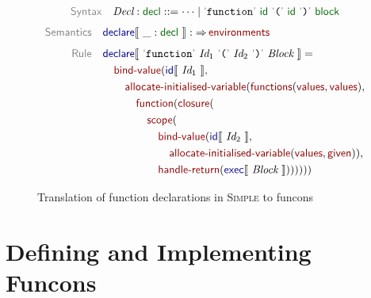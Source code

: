 \documentclass[runningheads,fleqn]{llncs}
\begin{document}
\begin{figure}
    \centering

\begin{align*}
  \KEY{Syntax} \quad
    \VAR{Decl} : \SYN{decl}
      ::= \cdots \mid 
      \LEX{function} \ \SYN{id} \ \LEX{(} \ \SYN{id} \ \LEX{)} \ \SYN{block}
\end{align*}
\begin{align*}
  \KEY{Semantics} \quad
  & \SEM{declare} \LEFTPHRASE \ \_ : \SYN{decl} \ \RIGHTPHRASE  
    :  \TO \NAME{environments} 
\\[1ex]
  \KEY{Rule} \quad
    & \SEM{declare} \LEFTPHRASE \
        \LEX{function} \ \VAR{Id}_1 \ \LEX{(} \ \VAR{Id}_2 \ \LEX{)} \ \VAR{Block} \
                          \RIGHTPHRASE  = \\&\quad
      \NAME{bind-value}
        ( \SEM{id} \LEFTPHRASE \ \VAR{Id}_1 \ \RIGHTPHRASE , \\&\quad\quad
               \NAME{allocate-initialised-variable}
                (  \NAME{functions}
                        (  \NAME{values}, 
                           \NAME{values} ),
                    \\&\quad\quad\quad
               \NAME{function} 
                ( \NAME{closure}
                  ( \\&\quad\quad\quad\quad \NAME{scope}
                          ( \\&\quad\quad\quad\quad\quad \NAME{bind-value}
                                  (  \SEM{id} \LEFTPHRASE \ \VAR{Id}_2 \ \RIGHTPHRASE ,\\&\quad\quad\quad\quad\quad\quad
                            \NAME{allocate-initialised-variable}
                (  \NAME{values}, 
                                  \NAME{given} ) ), \\&\quad\quad\quad\quad\quad
                                 \NAME{handle-return}
                                  (  \SEM{exec} \LEFTPHRASE \ \VAR{Block} \ \RIGHTPHRASE  ) ) ) ) )
                    )
\end{align*}

    \caption{Translation of function declarations in \textsc{Simple} to funcons}
    \label{fig:declarations}
\end{figure}


\section{Defining and Implementing Funcons}
\label{sec:msos}
\end{document}

